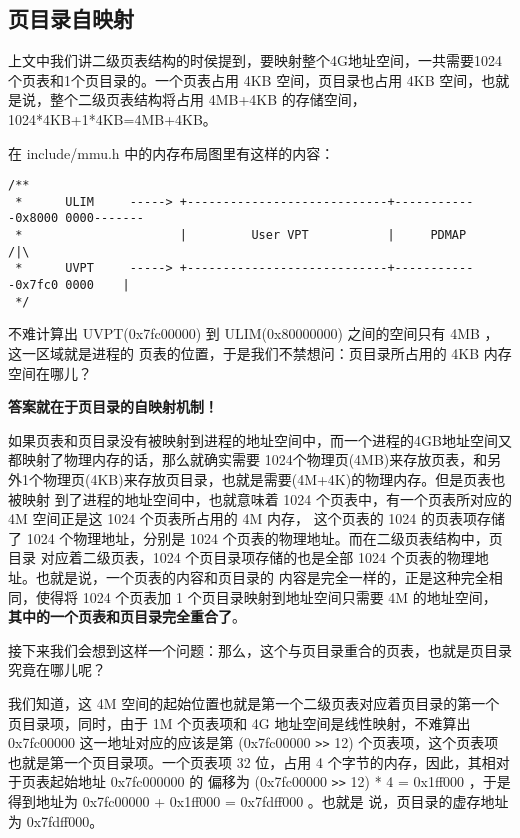\subsection{页目录自映射}

上文中我们讲二级页表结构的时侯提到，要映射整个4G地址空间，一共需要1024个页表和1个页目录的。一个页表占用 4KB
空间，页目录也占用 4KB 空间，也就是说，整个二级页表结构将占用 4MB+4KB 的存储空间，1024*4KB+1*4KB=4MB+4KB。

在 include/mmu.h 中的内存布局图里有这样的内容：

\begin{verbatim}
/**
 *      ULIM     -----> +----------------------------+------------0x8000 0000-------
 *                      |         User VPT           |     PDMAP                /|\
 *      UVPT     -----> +----------------------------+------------0x7fc0 0000    |
 */
\end{verbatim}

不难计算出 UVPT(0x7fc00000) 到 ULIM(0x80000000) 之间的空间只有 4MB ，这一区域就是进程的
页表的位置，于是我们不禁想问：页目录所占用的 4KB 内存空间在哪儿？

\textbf{答案就在于页目录的自映射机制！}

如果页表和页目录没有被映射到进程的地址空间中，而一个进程的4GB地址空间又都映射了物理内存的话，那么就确实需要
1024个物理页(4MB)来存放页表，和另外1个物理页(4KB)来存放页目录，也就是需要(4M+4K)的物理内存。但是页表也被映射
到了进程的地址空间中，也就意味着 1024 个页表中，有一个页表所对应的 4M 空间正是这 1024 个页表所占用的 4M 内存，
这个页表的 1024 的页表项存储了 1024 个物理地址，分别是 1024 个页表的物理地址。而在二级页表结构中，页目录
对应着二级页表，1024 个页目录项存储的也是全部 1024 个页表的物理地址。也就是说，一个页表的内容和页目录的
内容是完全一样的，正是这种完全相同，使得将 1024 个页表加 1 个页目录映射到地址空间只需要 4M 的地址空间，
\textbf{其中的一个页表和页目录完全重合了}。

接下来我们会想到这样一个问题：那么，这个与页目录重合的页表，也就是页目录究竟在哪儿呢？

我们知道，这 4M 空间的起始位置也就是第一个二级页表对应着页目录的第一个页目录项，同时，由于 1M 个页表项和 4G
地址空间是线性映射，不难算出 0x7fc00000 这一地址对应的应该是第 (0x7fc00000 \verb|>>| 12) 个页表项，这个页表项
也就是第一个页目录项。一个页表项 32 位，占用 4 个字节的内存，因此，其相对于页表起始地址 0x7fc000000 的
偏移为 (0x7fc00000 \verb|>>| 12) * 4 = 0x1f\/f000 ，于是得到地址为 0x7fc00000 + 0x1f\/f000 = 0x7fdf\/f000 。也就是
说，页目录的虚存地址为 0x7fdf\/f000。

